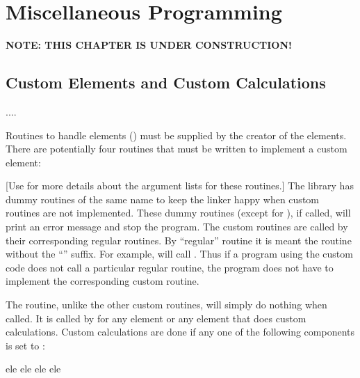 \chapter{Miscellaneous Programming}

{\bf NOTE: THIS CHAPTER IS UNDER CONSTRUCTION!}

\section{Custom Elements and Custom Calculations}
\label{s:custom.ele}

\NeedsWork....

Routines to handle  elements () must be supplied
by the creator of the elements.
There are potentially four routines that must be written to implement a custom 
element:
\begin{example}
\end{example}
[Use  for more details about the argument lists for these
routines.]  The \bmad library has dummy routines of the same name to
keep the linker happy when custom routines are not implemented. These
dummy routines (except for ), if called, will print an
error message and stop the program. The custom routines are called by
their corresponding regular routines. By ``regular'' routine it is
meant the routine without the ``'' suffix. For example,
 will call
. Thus if a program using the custom
code does not call a particular regular routine, the program does not
have to implement the corresponding custom routine.

The  routine, unlike the other custom routines, will
simply do nothing when called. It is called by  for
any  element or any element that does custom calculations.
Custom calculations are done if any one of the following
 components is set to :
\begin{example}
  ele%
  ele%
  ele%
  ele%
\end{example}

